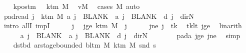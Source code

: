 \begin{isabellebody}
\ \ \isamarkupfalse%
\ kpos{\isacharunderscore}{\kern0pt}tm{\isacharcolon}{\kern0pt}\ {\isachardoublequoteopen}{}\ {\isacharless}{\kern0pt}\ k{\isacharunderscore}{\kern0pt}tm\ M{\isachardoublequoteclose}\ \isamarkupfalse%
\ vM\ \isamarkupfalse%
\ {\isacharparenleft}{\kern0pt}cases\ M{\isacharparenright}{\kern0pt}\ auto\isanewline
\ \ \isamarkupfalse%
\ pad{\isacharunderscore}{\kern0pt}read{\isacharcolon}{\kern0pt}\ {\isachardoublequoteopen}{\isasymforall}j\ {\isasymge}\ k{\isacharunderscore}{\kern0pt}tm\ M{\isachardot}{\kern0pt}\ {\isacharquery}{\kern0pt}a\ j\ {\isacharequal}{\kern0pt}\ BLANK{}\ {\isasymand}\ {\isacharquery}{\kern0pt}a\ j\ {\isacharequal}{\kern0pt}\ BLANK{}\ {\isasymand}\ {\isacharquery}{\kern0pt}d\ j\ {\isacharequal}{\kern0pt}\ dir{\isachardot}{\kern0pt}N{\isachardoublequoteclose}\isanewline
\ \ \isamarkupfalse%
\ {\isacharparenleft}{\kern0pt}intro\ allI\ impI{\isacharparenright}{\kern0pt}\isanewline
\ \ \ \ \isamarkupfalse%
\ j\ \isamarkupfalse%
\ jge{\isacharcolon}{\kern0pt}\ {\isachardoublequoteopen}k{\isacharunderscore}{\kern0pt}tm\ M\ {\isasymle}\ j{\isachardoublequoteclose}\isanewline
\ \ \ \ \isamarkupfalse%
\ jne{\isacharcolon}{\kern0pt}\ {\isachardoublequoteopen}j\ {\isasymnoteq}\ tk{\isachardoublequoteclose}\ \isamarkupfalse%
\ tk{\isacharunderscore}{\kern0pt}lt\ jge\ \isamarkupfalse%
\ linarith\isanewline
\ \ \ \ \isamarkupfalse%
\ {\isachardoublequoteopen}{\isacharquery}{\kern0pt}a\ j\ {\isacharequal}{\kern0pt}\ BLANK{}\ {\isasymand}\ {\isacharquery}{\kern0pt}a\ j\ {\isacharequal}{\kern0pt}\ BLANK{}\ {\isasymand}\ {\isacharquery}{\kern0pt}d\ j\ {\isacharequal}{\kern0pt}\ dir{\isachardot}{\kern0pt}N{\isachardoublequoteclose}\isanewline
\ \ \ \ \ \ \isamarkupfalse%
\ pad{\isacharunderscore}{\kern0pt}a\ jge\ jne\ \isamarkupfalse%
\ simp\isanewline
\ \ \isamarkupfalse%
\isanewline
\ \ \isamarkupfalse%
\ dst{\isacharunderscore}{\kern0pt}bd{\isacharcolon}{\kern0pt}\ {\isachardoublequoteopen}ar{\isacharunderscore}{\kern0pt}stage{\isacharunderscore}{\kern0pt}bounded\ {\isacharparenleft}{\kern0pt}bl{\isacharunderscore}{\kern0pt}tm\ M{\isacharparenright}{\kern0pt}\ {\isacharparenleft}{\kern0pt}k{\isacharunderscore}{\kern0pt}tm\ M{\isacharparenright}{\kern0pt}\ {\isacharparenleft}{\kern0pt}snd\ {\isacharquery}{\kern0pt}s{\isacharprime}{\kern0pt}{\isacharparenright}{\kern0pt}{\isachardoublequoteclose}\isanewline

\end{isabellebody}
